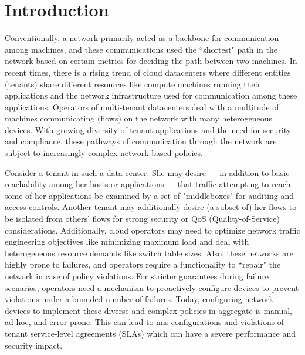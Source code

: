 \section{Introduction}
Conventionally, a network primarily acted as a backbone for 
communication among machines, and these communications
used the ``shortest" path in the network based on certain metrics
for deciding the path between two machines. 
In recent times, there is a rising trend of cloud datacenters where
different entities (tenants) share different resources like compute
machines running their applications and 
the network infrastructure used for communication 
among these applications.  
Operators of multi-tenant datacenters deal with a multitude of
machines communicating (flows) on the network 
with many heterogeneous devices. With growing
diversity of tenant applications and the 
need for security and compliance, 
these pathways of communication
through the network are subject to
increasingly complex network-based policies.

Consider a tenant in such a data center. She may desire --- in addition
to basic reachability among her hosts or applications --- that traffic
attempting to reach some of her applications be examined by a set of
"middleboxes" for auditing and access controls. Another tenant may
additionally desire (a subset of) her flows to be isolated from
others' flows for strong security or QoS (Quality-of-Service) considerations.
 Additionally,
cloud operators may need to optimize network traffic engineering objectives
like minimizing maximum load 
and deal with heterogeneous resource demands like switch table 
sizes. Also, these networks are highly prone to failures,
and operators require a functionality to ``repair" the network
 in case of  policy 
violations. For stricter guarantees during failure scenarios,
operators need a mechanism to proactively configure devices to 
prevent violations under a bounded number of failures. 
Today, configuring network devices to implement these diverse
and complex policies in aggregate is manual, ad-hoc, and error-prone. 
This can lead to mis-configurations and violations of tenant
service-level agreements (SLAs) which can have a severe performance and
security impact.


